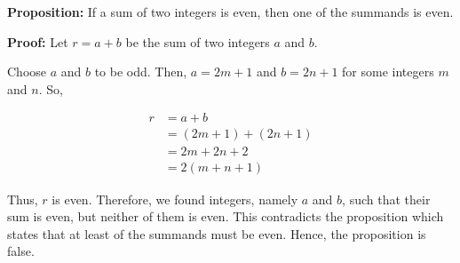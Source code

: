 \documentclass{article}
\begin{document}
\textbf{Proposition:} If a sum of two integers is even, then one of the summands is even.

\textbf{Proof:} Let $r=a+b$ be the sum of two integers $a$ and $b$.

Choose $a$ and $b$ to be odd. Then, $a=2m+1$ and $b=2n+1$ for some integers $m$ and $n$. So,

\begin{align*}
r&=a+b\\
&=(2m+1)+(2n+1)\\
&=2m+2n+2\\
&=2(m+n+1)
\end{align*}

Thus, $r$ is even. Therefore, we found integers, namely $a$ and $b$, such that
their sum is even, but neither of them is even. This contradicts the proposition
which states that at least of the summands must be even. Hence, the proposition is false.
\end{document}
